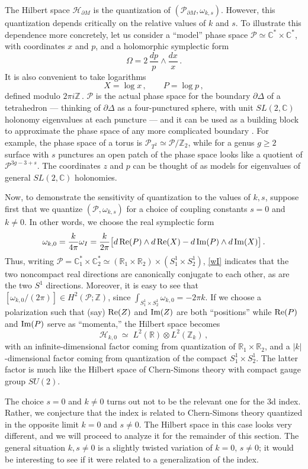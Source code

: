 \documentclass[11pt,letterpaper]{article}
\numberwithin{equation}{section}
\newcommand{\be}{\begin{equation}}
\newcommand{\ee}{\end{equation}}
\newcommand{\Z}{{\mathbb Z}}
\newcommand{\R}{{\mathbb R}}
\newcommand{\C}{{\mathbb C}}
\renewcommand{\Re}{{\rm Re}}
\renewcommand{\Im}{{\rm Im}}
\newcommand{\pd}{\partial}
\newcommand{\CH}{\mathcal{H}}
\newcommand{\CP}{\mathcal{P}}
\begin{document}
The Hilbert space $\CH_{\pd M}$ is the quantization of $(\CP_{\pd M},\omega_{k,s})$. However, this quantization depends critically on the relative values of $k$ and $s$. To illustrate this dependence more concretely, let us consider a ``model'' phase space $\CP\simeq \C^*\times\C^*$, with coordinates $x$ and $p$, and a holomorphic symplectic form
%
\be \Omega = 2\,\frac{dp}{p}\wedge \frac{dx}{x}\,. \label{Omega}\ee
%
It is also convenient to take logarithms
%
\be X = \log x\,,\qquad P=\log p\,, \ee
%
defined modulo $2\pi i\Z$\,. $\CP$ is the actual phase space for the boundary $\pd\Delta$ of a tetrahedron --- thinking of $\pd \Delta$ as a four-punctured sphere, with unit $SL(2,\C)$ holonomy eigenvalues at each puncture \cite{DGG} --- and it can be used as a building block to approximate the phase space of any more complicated boundary \cite{DGGV-hybrid}. For example, the phase space of a torus is $\CP_{T^2}\simeq \CP/\Z_2$, while for a genus $g\geq 2$ surface with $s$ punctures an open patch of the phase space looks like a quotient of $\CP^{3g-3+s}$. The coordinates $z$ and $p$ can be thought of as models for eigenvalues of general $SL(2,\C)$ holonomies.

Now, to demonstrate the sensitivity of quantization to the values of $k,s$, suppose first that we quantize $(\CP,\omega_{k,s})$ for a choice of coupling constants $s=0$ and $k\neq 0$. In other words, we choose the real symplectic form
%
\be \omega_{k,0} = \frac{k}{4\pi}\omega_I = \frac{k}{2\pi}\big[d\,\Re(P)\wedge d\,\Re(X)- d\,\Im(P)\wedge d\,\Im(X)\big]\,. \label{wI}\ee
%
Thus, writing $\CP = \C^*_1\times \C^*_2\simeq (\R_1\times \R_2)\times(S^1_1\times S^1_2)$, \eqref{wI} indicates that the two noncompact real directions are canonically conjugate to each other, as are the two $S^1$ directions. Moreover, it is easy to see that $[\omega_{k,0}/(2\pi)]\in H^2(\CP;\Z)$, since $\int_{S^1_1\times S^1_2}\omega_{k,0}=-2\pi k$. If we choose a polarization such that (say) $\Re(Z)$ and $\Im(Z)$ are both ``positions'' while $\Re(P)$ and $\Im(P)$ serve as ``momenta,'' the Hilbert space becomes
%
\be \CH_{k,0} \;\simeq\; L^2(\R)\otimes L^2(\Z_k)\,, \ee
%
with an infinite-dimensional factor coming from quantization of $\R_1\times \R_2$, and a $|k|$-dimensional factor coming from quantization of the compact $S^1_1\times S^1_2$. The latter factor is much like the Hilbert space of Chern-Simons theory with compact gauge group $SU(2)$.%


The choice $s=0$ and $k\neq 0$ turns out not to be the relevant one for the 3d index. Rather, we conjecture that the index is related to Chern-Simons theory quantized in the opposite limit $k=0$ and $s\neq 0$. The Hilbert space in this case looks very different, and we will proceed to analyze it for the remainder of this section. The general situation $k,s\neq 0$ is a slightly twisted variation of $k=0,\,s\neq 0$; it would be interesting to see if it were related to a generalization of the index.
\end{document}
